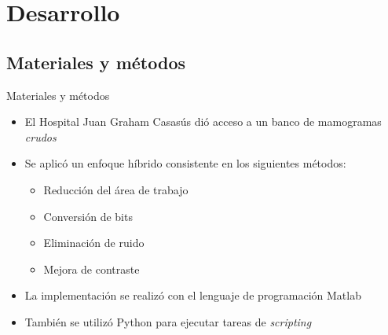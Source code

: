 \documentclass{beamer}
\begin{document}
\section{Desarrollo}
\subsection{Materiales y métodos}
\begin{frame}{Materiales y métodos}
\transdissolve
  \pause
  \begin{itemize}[<+-| alert@+>]
    \item El Hospital Juan Graham Casasús dió acceso a un banco de mamogramas \textit{crudos}
    \item Se aplicó un enfoque híbrido consistente en los siguientes métodos:
    \begin{itemize}[<+-| alert@+>]
        \item Reducción del área de trabajo
        \item Conversión de bits
        \item Eliminación de ruido
        \item Mejora de contraste
    \end{itemize}
    \item La implementación se realizó con el lenguaje de programación Matlab
    \item También se utilizó Python para ejecutar tareas de \textit{scripting}
  \end{itemize}
\end{frame}

{
\begin{frame}{}
\transdissolve
\end{frame}
}
\end{document}
